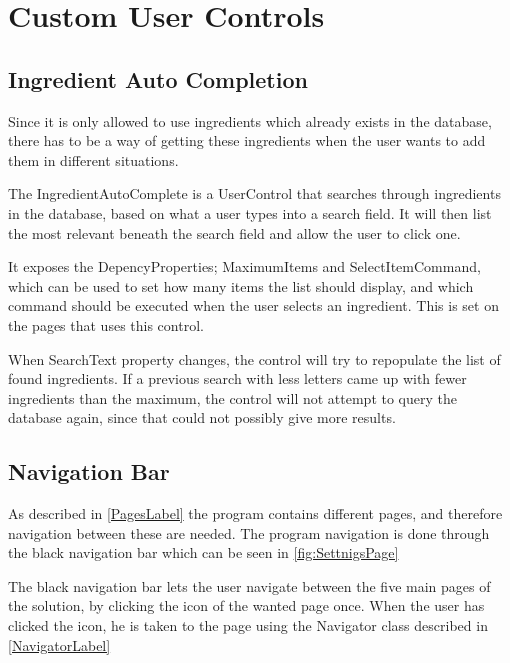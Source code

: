 \section{Custom User Controls}

\subsection{Ingredient Auto Completion} \label{sec:AutoComplete}
Since it is only allowed to use ingredients which already exists in the database, there has to be a way of getting these ingredients when the user wants to add them in different situations.

The IngredientAutoComplete is a UserControl that searches through ingredients in the database, based on what a user types into a search field. It will then list the most relevant beneath the search field and allow the user to click one.

It exposes the DepencyProperties; MaximumItems and SelectItemCommand, which can be used to set how many items the list should display, and which command should be executed when the user selects an ingredient. This is set on the pages that uses this control.

When SearchText property changes, the control will try to repopulate the list of found ingredients. If a previous search with less letters came up with fewer ingredients than the maximum, the control will not attempt to query the database again, since that could not possibly give more results.

\subsection{Navigation Bar}

As described in \cref{PagesLabel} the program contains different pages, and therefore navigation between these are needed. The program navigation is done through the black navigation bar which can be seen in \cref{fig:SettnigsPage}

The black navigation bar lets the user navigate between the five main pages of the solution, by clicking the icon of the wanted page once. When the user has clicked the icon, he is taken to the page using the Navigator class described in \cref{NavigatorLabel}